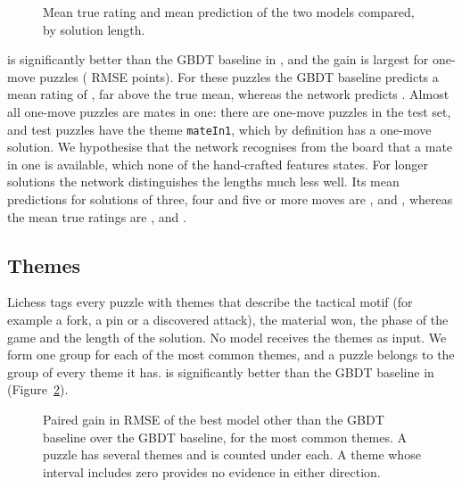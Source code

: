 \documentclass[11pt]{article}
\begin{document}
\begin{figure}[htbp]\centering
{}
\caption{Mean true rating and mean prediction of the two models compared, by
solution length.}
\label{fig:slice-moves}
\end{figure}

 is significantly better than the GBDT baseline in
, and the gain is largest for one-move puzzles
( RMSE points). For these puzzles the GBDT baseline
predicts a mean rating of , far above the
true mean, whereas the network predicts .
Almost all one-move puzzles are mates in one: there are
 one-move puzzles in the test set, and
 test puzzles have the theme \texttt{mateIn1},
which by definition has a one-move solution.
We hypothesise that the network recognises from the board that a mate in one
is available, which none of the hand-crafted features states. For longer
solutions the network distinguishes the lengths much less well. Its mean
predictions for solutions of three, four and five or more moves are
,  and
, whereas the mean true ratings are
,  and
.

\subsection{Themes}

Lichess tags every puzzle with themes that describe the tactical motif (for
example a fork, a pin or a discovered attack), the material won, the phase of
the game and the length of the solution. No model receives the themes as
input. We form one group for each of the  most
common themes, and a puzzle belongs to the group of every theme it has.
 is significantly better than the GBDT baseline in
 (Figure~\ref{fig:themes}).

\begin{figure}[htbp]\centering
{}
\caption{Paired gain in RMSE of the best model other than the GBDT baseline
over the GBDT baseline, for the  most common themes.
A puzzle has several themes and is counted under each. A theme whose interval
includes zero provides no evidence in either direction.}
\label{fig:themes}
\end{figure}
\end{document}
